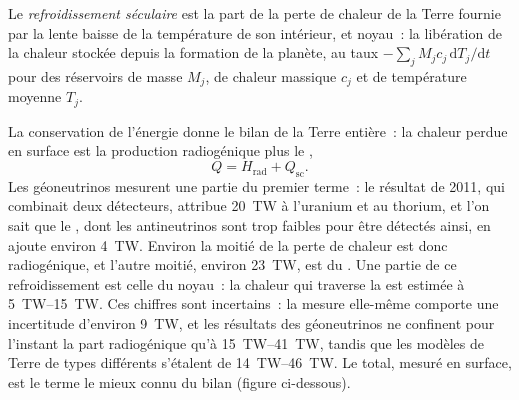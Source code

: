 \begin{definition}\label{def:b1:heat-budget:secular-cooling}
Le \emph{refroidissement séculaire} est la part de la perte de
chaleur de la Terre fournie par la lente baisse de la température de son
intérieur,  et noyau~: la libération de la chaleur stockée depuis la
formation de la planète, au taux $-\sum_j M_j c_j\,\mathrm dT_j/\mathrm dt$ pour
des réservoirs de masse $M_j$, de chaleur massique $c_j$ et de température
moyenne $T_j$.
\end{definition}

La conservation de l'énergie donne le bilan de la Terre entière~: la chaleur
perdue en surface est la production radiogénique plus le ,
\[
  Q = H_{\text{rad}} + Q_{\text{sc}} .
\]
Les géoneutrinos mesurent une partie du premier terme~: le résultat de 2011, qui
combinait deux détecteurs, attribue \qty{20}{TW} à l'uranium et au thorium, et
l'on sait que le , dont les antineutrinos sont trop faibles pour être
détectés ainsi, en ajoute environ \qty{4}{TW}.
Environ la moitié de la perte de chaleur est donc radiogénique, et l'autre moitié,
environ \qty{23}{TW}, est du . Une partie de ce
refroidissement est celle du noyau~: la chaleur qui traverse la  est estimée à \qtyrange{5}{15}{TW}. Ces chiffres sont incertains~:
la mesure elle-même comporte une incertitude d'environ \qty{9}{TW}, et les
résultats des géoneutrinos ne confinent pour l'instant la part radiogénique qu'à
\qtyrange{15}{41}{TW}, tandis que les modèles de Terre de types différents
s'étalent de \qtyrange{14}{46}{TW}. Le total, mesuré en surface, est le terme le
mieux connu du bilan (figure ci-dessous).


